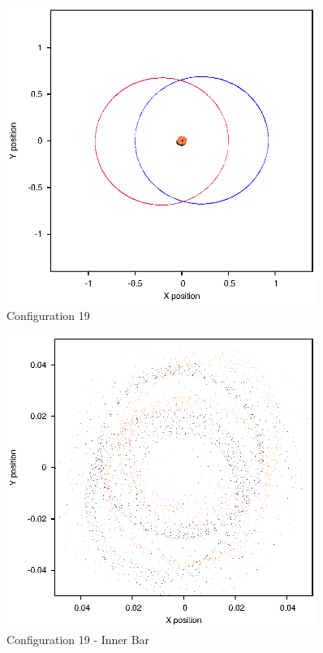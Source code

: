 \documentclass[a4paper,12pt]{article}
\begin{document}
\begin{figure}[H]
\centering
\includegraphics[width=0.9\textwidth]{./2017results/06-8-06-25/Orbit.eps}
\caption{Configuration 19}
\label{fig:config19}
\end{figure}
\begin{figure}[H]
\centering
\includegraphics[width=0.9\textwidth]{./2017results/06-8-06-25/Inner.eps}
\caption{Configuration 19 - Inner Bar}
\label{fig:config19i}
\end{figure}
\end{document}
